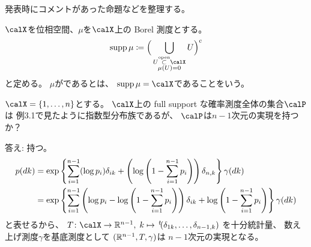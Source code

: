 \documentclass[report]{jlreq}
\begin{document}
%

発表時にコメントがあった命題などを整理する。

\begin{definition}
    $\calX$を位相空間、$\mu$を$\calX$上の Borel 測度とする。
    \begin{equation}
        \supp\mu \coloneqq \Big(
            \bigcup_{\substack{U \opensubset \calX \\ \mu(U) = 0}} U
        \Big)^c
    \end{equation}
    と定める。
    $\mu$がであるとは、
    $\supp\mu = \calX$であることをいう。
\end{definition}

\begin{problem}
    $\calX = \{ 1, \dots, n \}$とする。
    $\calX$上の full support な確率測度全体の集合$\calP$は
    例3.1で見たように指数型分布族であるが、
    $\calP$は$n - 1$次元の実現を持つか？
\end{problem}

\begin{answer}
    答え: 持つ。
    \begin{alignat}{1}
        p(dk)
            &=
                \exp\left\{{
                    \sum_{i = 1}^{n - 1}
                        (\log p_i) \delta_{ik}
                    +
                    \left({
                        \log\left({
                            1 - \sum_{i = 1}^{n - 1} p_i
                        }\right)
                    }\right)
                    \delta_{n, k}
                }\right\}
                \gamma(dk)
                \\
            &=
                \exp\left\{{
                    \sum_{i = 1}^{n - 1}
                        \left({
                            \log p_i
                            -
                            \log\left({
                                1 - \sum_{i = 1}^{n - 1} p_i
                            }\right)
                        }\right)
                        \delta_{ik}
                    +
                    \log\left({
                        1 - \sum_{i = 1}^{n - 1} p_i
                    }\right)
                }\right\}
                \gamma(dk)
    \end{alignat}
    と表せるから、
    $T \colon \calX \to \R^{n - 1}, \;
        k \mapsto \up{t}(\delta_{1k}, \dots, \delta_{n - 1, k})$
    を十分統計量、
    数え上げ測度$\gamma$を基底測度として
    $(\mathbb{R}^{n - 1}, T, \gamma)$は
    $n - 1$次元の実現となる。
\end{answer}
\end{document}
